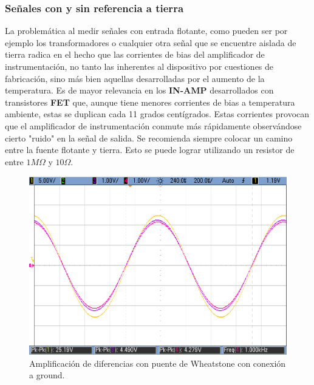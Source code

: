 \subsubsection{Señales con y sin referencia a tierra}
La problemática al medir señales con entrada flotante, como pueden ser por ejemplo los transformadores o cualquier otra señal que se encuentre aislada de tierra radica en el hecho que las corrientes de bias del amplificador de instrumentación, no tanto las inherentes al dispositivo por cuestiones de fabricación, sino más bien aquellas desarrolladas por el aumento de la temperatura. Es de mayor relevancia en los \textbf{IN-AMP} desarrollados con transistores \textbf{FET} que, aunque tiene menores corrientes de bias a temperatura ambiente, estas se duplican cada 11 grados centígrados. Estas corrientes provocan que el amplificador de instrumentación conmute más rápidamente observándose cierto "ruido" en la señal de salida. Se recomienda siempre colocar un camino entre la fuente flotante y tierra. Esto se puede lograr utilizando un resistor de entre $1M\Omega$ y  $10\Omega$.

\begin{figure}[H]
	\centering
	\includegraphics[height=0.3\textheight]{./ImagenesDeOsciloscopio/WheatStoneTierra1.png}
	\caption{Amplificación de diferencias con puente de Wheatstone con conexión a ground.}
\end{figure}

